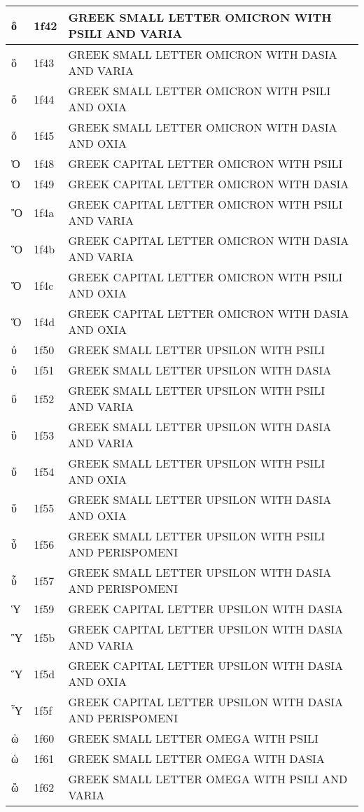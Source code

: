 \documentclass[12pt,letterpaper,openany]{book}
\begin{document}
\begin{center}
\begin{supertabular}{|m{0.25in}|m{0.5in}|m{4in}|}
ὂ & 1f42 & GREEK SMALL LETTER OMICRON WITH PSILI AND VARIA\\\hline
ὃ & 1f43 & GREEK SMALL LETTER OMICRON WITH DASIA AND VARIA\\\hline
ὄ & 1f44 & GREEK SMALL LETTER OMICRON WITH PSILI AND OXIA\\\hline
ὅ & 1f45 & GREEK SMALL LETTER OMICRON WITH DASIA AND OXIA\\\hline
Ὀ & 1f48 & GREEK CAPITAL LETTER OMICRON WITH PSILI\\\hline
Ὁ & 1f49 & GREEK CAPITAL LETTER OMICRON WITH DASIA\\\hline
Ὂ & 1f4a & GREEK CAPITAL LETTER OMICRON WITH PSILI AND VARIA\\\hline
Ὃ & 1f4b & GREEK CAPITAL LETTER OMICRON WITH DASIA AND VARIA\\\hline
Ὄ & 1f4c & GREEK CAPITAL LETTER OMICRON WITH PSILI AND OXIA\\\hline
Ὅ & 1f4d & GREEK CAPITAL LETTER OMICRON WITH DASIA AND OXIA\\\hline
ὐ & 1f50 & GREEK SMALL LETTER UPSILON WITH PSILI\\\hline
ὑ & 1f51 & GREEK SMALL LETTER UPSILON WITH DASIA\\\hline
ὒ & 1f52 & GREEK SMALL LETTER UPSILON WITH PSILI AND VARIA\\\hline
ὓ & 1f53 & GREEK SMALL LETTER UPSILON WITH DASIA AND VARIA\\\hline
ὔ & 1f54 & GREEK SMALL LETTER UPSILON WITH PSILI AND OXIA\\\hline
ὕ & 1f55 & GREEK SMALL LETTER UPSILON WITH DASIA AND OXIA\\\hline
ὖ & 1f56 & GREEK SMALL LETTER UPSILON WITH PSILI AND PERISPOMENI\\\hline
ὗ & 1f57 & GREEK SMALL LETTER UPSILON WITH DASIA AND PERISPOMENI\\\hline
Ὑ & 1f59 & GREEK CAPITAL LETTER UPSILON WITH DASIA\\\hline
Ὓ & 1f5b & GREEK CAPITAL LETTER UPSILON WITH DASIA AND VARIA\\\hline
Ὕ & 1f5d & GREEK CAPITAL LETTER UPSILON WITH DASIA AND OXIA\\\hline
Ὗ & 1f5f & GREEK CAPITAL LETTER UPSILON WITH DASIA AND PERISPOMENI\\\hline
ὠ & 1f60 & GREEK SMALL LETTER OMEGA WITH PSILI\\\hline
ὡ & 1f61 & GREEK SMALL LETTER OMEGA WITH DASIA\\\hline
ὢ & 1f62 & GREEK SMALL LETTER OMEGA WITH PSILI AND VARIA\\\hline

\end{supertabular}
\end{center}
\end{document}
